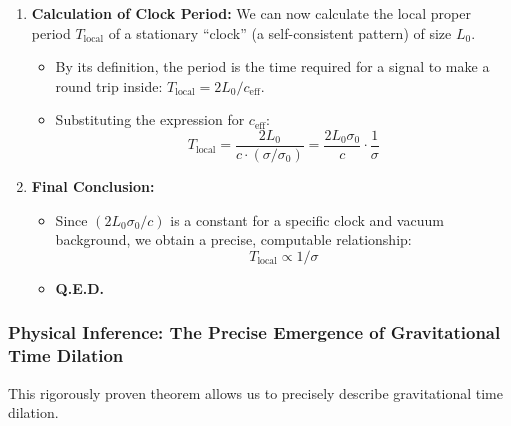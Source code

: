\documentclass[11pt, a4paper]{article}
\begin{document}
\begin{enumerate}
    \item \textbf{Calculation of Clock Period:} We can now calculate the local proper period $T_{\text{local}}$ of a stationary ``clock'' (a self-consistent pattern) of size $L_0$.
    \begin{itemize}
        \item By its definition, the period is the time required for a signal to make a round trip inside: $T_{\text{local}} = 2L_0 / c_{\text{eff}}$.
        \item Substituting the expression for $c_{\text{eff}}$:
        \[
        T_{\text{local}} = \frac{2L_0}{c \cdot (\sigma / \sigma_0)} = \frac{2L_0\sigma_0}{c} \cdot \frac{1}{\sigma}
        \]
    \end{itemize}

    \item \textbf{Final Conclusion:}
    \begin{itemize}
        \item Since $(2L_0\sigma_0 / c)$ is a constant for a specific clock and vacuum background, we obtain a precise, computable relationship:
        \[
        T_{\text{local}} \propto 1/\sigma
        \]
        \item \textbf{Q.E.D.}
    \end{itemize}
\end{enumerate}

\subsubsection*{Physical Inference: The Precise Emergence of Gravitational Time Dilation}

This rigorously proven theorem allows us to precisely describe gravitational time dilation.
\end{document}
